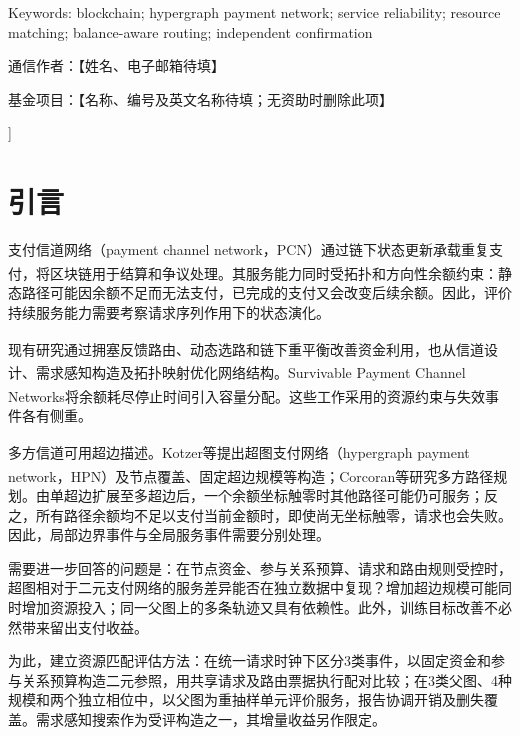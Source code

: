 \documentclass[UTF8,a4paper,twocolumn,fontset=none,zihao=5]{ctexart}
\newcommand{\upcite}[1]{\textsuperscript{\cite{#1}}}
\begin{document}
{\begin{minipage}{\textwidth}
{\small\noindent Keywords: blockchain; hypergraph payment network; service reliability; resource matching; balance-aware routing; independent confirmation\par}\vspace{3pt}

{\small\noindent 通信作者：【姓名、电子邮箱待填】\par}\vspace{3pt}

{\small\noindent 基金项目：【名称、编号及英文名称待填；无资助时删除此项】\par}\vspace{3pt}

\vspace{7pt}\end{minipage}}]

\section{引言}

支付信道网络（payment channel network，PCN）通过链下状态更新承载重复支付，将区块链用于结算和争议处理\upcite{r1,r2}。其服务能力同时受拓扑和方向性余额约束：静态路径可能因余额不足而无法支付，已完成的支付又会改变后续余额。因此，评价持续服务能力需要考察请求序列作用下的状态演化。


现有研究通过拥塞反馈路由\upcite{r3}、动态选路\upcite{r4}和链下重平衡\upcite{r5}改善资金利用，也从信道设计\upcite{r6}、需求感知构造\upcite{r7}及拓扑映射\upcite{r8}优化网络结构。Survivable Payment Channel Networks将余额耗尽停止时间引入容量分配\upcite{r9}。这些工作采用的资源约束与失效事件各有侧重。


多方信道可用超边描述。Kotzer等\upcite{r10}提出超图支付网络（hypergraph payment network，HPN）及节点覆盖、固定超边规模等构造；Corcoran等\upcite{r11}研究多方路径规划。由单超边扩展至多超边后，一个余额坐标触零时其他路径可能仍可服务；反之，所有路径余额均不足以支付当前金额时，即使尚无坐标触零，请求也会失败。因此，局部边界事件与全局服务事件需要分别处理。


需要进一步回答的问题是：在节点资金、参与关系预算、请求和路由规则受控时，超图相对于二元支付网络的服务差异能否在独立数据中复现？增加超边规模可能同时增加资源投入；同一父图上的多条轨迹又具有依赖性。此外，训练目标改善不必然带来留出支付收益。


为此，建立资源匹配评估方法：在统一请求时钟下区分3类事件，以固定资金和参与关系预算构造二元参照，用共享请求及路由票据执行配对比较；在3类父图、4种规模和两个独立相位中，以父图为重抽样单元评价服务，报告协调开销及删失覆盖。需求感知搜索作为受评构造之一，其增量收益另作限定。
\end{document}
